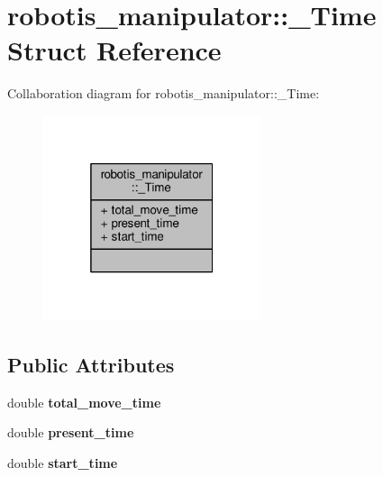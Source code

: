 \hypertarget{structrobotis__manipulator_1_1___time}{}\section{robotis\+\_\+manipulator\+:\+:\+\_\+\+Time Struct Reference}
\label{structrobotis__manipulator_1_1___time}


Collaboration diagram for robotis\+\_\+manipulator\+:\+:\+\_\+\+Time\+:
\nopagebreak
\begin{figure}[H]
\begin{center}
\leavevmode
\includegraphics[width=181pt]{structrobotis__manipulator_1_1___time__coll__graph}
\end{center}
\end{figure}
\subsection*{Public Attributes}
\begin{DoxyCompactItemize}
\item 
double {\bfseries total\+\_\+move\+\_\+time}\hypertarget{structrobotis__manipulator_1_1___time_accf51afbf3c4ab001f6390dd881d4aaf}{}\label{structrobotis__manipulator_1_1___time_accf51afbf3c4ab001f6390dd881d4aaf}

\item 
double {\bfseries present\+\_\+time}\hypertarget{structrobotis__manipulator_1_1___time_aff70f6d9fe6ab2f128abc9850654a0ed}{}\label{structrobotis__manipulator_1_1___time_aff70f6d9fe6ab2f128abc9850654a0ed}

\item 
double {\bfseries start\+\_\+time}\hypertarget{structrobotis__manipulator_1_1___time_a53c9415b61bed4425ace9ea9932cf8cf}{}\label{structrobotis__manipulator_1_1___time_a53c9415b61bed4425ace9ea9932cf8cf}

\end{DoxyCompactItemize}



